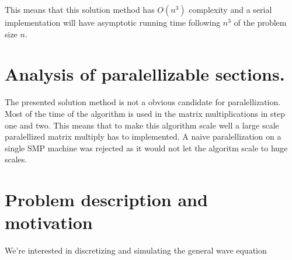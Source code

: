 \documentclass{article}
\begin{document}
This means that this solution method has $O(n^3)$ complexity and a serial implementation
will have asymptotic running time following $n^3$ of the problem size $n$.

\section{Analysis of paralellizable sections.}
The presented solution method is not a obvious candidate for paralellization.
Most of the time of the algorithm is used in the matrix multiplications in step one
and two. This means that to make this algorithm scale well a large scale paralellized
matrix multiply has to implemented. A naive paralellization on a single SMP machine
was rejected as it would not let the algoritm scale to huge scales.

\section{Problem description and motivation}
We're interested in discretizing and simulating the general wave equation
\end{document}

